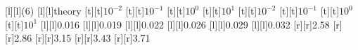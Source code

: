[l][l]{\fontsize{5.5}{8.25}\selectfont \color[rgb]{0,0,0}(6)}%
[l][l]{\fontsize{5.5}{8.25}\selectfont \color[rgb]{0,0,0}theory}%
%
\fontsize{5.5}{8.25}%
\selectfont%
%
[t][t]{$10^{-2}$}%
[t][t]{$10^{-1}$}%
[t][t]{$10^{0}$}%
[t][t]{$10^{1}$}%
[t][t]{$10^{-2}$}%
[t][t]{$10^{-1}$}%
[t][t]{$10^{0}$}%
[t][t]{$10^{1}$}%
%
[l][l]{0.016}%
[l][l]{0.019}%
[l][l]{0.022}%
[l][l]{0.026}%
[l][l]{0.029}%
[l][l]{0.032}%
[r][r]{2.58}%
[r][r]{2.86}%
[r][r]{3.15}%
[r][r]{3.43}%
[r][r]{3.71}%
%
%
